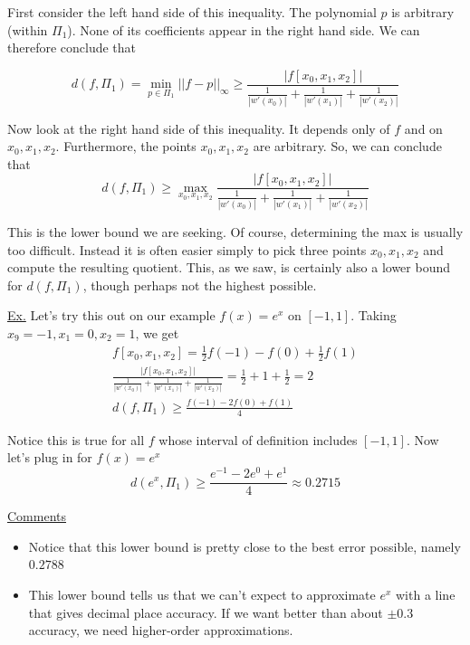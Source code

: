 {First consider the left hand side of this inequality. The polynomial $p$ is arbitrary (within $\Pi_1$). None of its coefficients appear in the right hand side. We can therefore conclude that

\begin{equation*}
    d(f, \Pi_1) = \min_{p \in \Pi_1}{||f - p||_\infty} \geq \frac{|f[x_0, x_1, x_2]|}{\frac{1}{|w'(x_0)|} + \frac{1}{|w'(x_1)|} + \frac{1}{|w'(x_2)|}}
\end{equation*}

Now look at the right hand side of this inequality. It depends only of $f$ and on $x_0, x_1, x_2$. Furthermore, the points $x_0, x_1, x_2$ are arbitrary. So, we can conclude that
\begin{equation*}
    d(f, \Pi_1) \geq \max_{x_0, x_1, x_2} {\frac{|f[x_0, x_1, x_2]|}{\frac{1}{|w'(x_0)|} + \frac{1}{|w'(x_1)|} + \frac{1}{|w'(x_2)|}}}
\end{equation*}

This is the lower bound we are seeking. Of course, determining the max is usually too difficult. Instead it is often easier simply to pick three points $x_0, x_1, x_2$ and compute the resulting quotient. This, as we saw, is certainly also a lower bound for $d(f, \Pi_1)$, though perhaps not the highest possible.

\underline{Ex.} Let's try this out on our example $f(x) = e^x$ on $[-1,1]$. Taking $x_9 = -1, x_1 = 0, x_2 = 1$, we get
\begin{align*}
    f[x_0, x_1, x_2] = \frac{1}{2} f(-1) - f(0) + \frac{1}{2} f(1) \\
    \frac{|f[x_0, x_1, x_2]|}{\frac{1}{|w'(x_0)|} + \frac{1}{|w'(x_1)|} + \frac{1}{|w'(x_2)|}} = \frac{1}{2} + 1 + \frac{1}{2} = 2 \\
    d(f, \Pi_1) \geq \frac{f(-1) - 2f(0) + f(1)}{4}
\end{align*}

Notice this is true for all $f$ whose interval of definition includes $[-1,1]$. Now let's plug in for $f(x) = e^x$
\begin{equation*}
    d(e^x, \Pi_1) \geq \frac{e^{-1} - 2e^0 + e^1}{4} \approx 0.2715
\end{equation*}

\underline{Comments}
\begin{itemize}
    \item Notice that this lower bound is pretty close to the best error possible, namely $0.2788$
    \item This lower bound tells us that we can't expect to approximate $e^x$ with a line that gives decimal place accuracy. If we want better than about $\pm 0.3$ accuracy, we need higher-order approximations.
\end{itemize}

}
